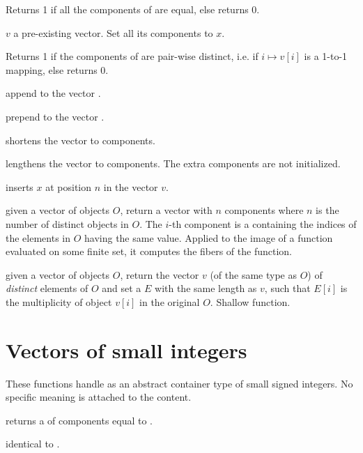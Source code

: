  Returns 1 if all the components of  are
equal, else returns 0.

 $v$ a pre-existing vector. Set all its
components to $x$.

  Returns 1 if the components of  are
pair-wise distinct, i.e. if $i\mapsto v[i]$ is a 1-to-1 mapping, else returns
0.

 append  to the vector .

 prepend  to the vector .

 shortens the vector  to 
components.

 lengthens the vector 
to  components. The extra components are not initialized.

 inserts $x$ at position $n$ in the vector
$v$.

 given a vector of objects $O$, return a vector
with $n$ components where $n$ is the number of distinct objects in $O$. The
$i$-th component is a  containing the indices of the elements
in $O$ having the same value. Applied to the image of a function evaluated on
some finite set, it computes the fibers of the function.

 given a vector of objects $O$,
return the vector $v$ (of the same type as $O$) of \emph{distinct} elements
of $O$ and set a  $E$ with the same length as $v$, such
that $E[i]$ is the multiplicity of object $v[i]$ in the original $O$.
Shallow function.

\section{Vectors of small integers}


These functions handle  as an abstract container type
of small signed integers. No specific meaning is attached to the content.

 returns a 
of  components equal to .

 identical to .

